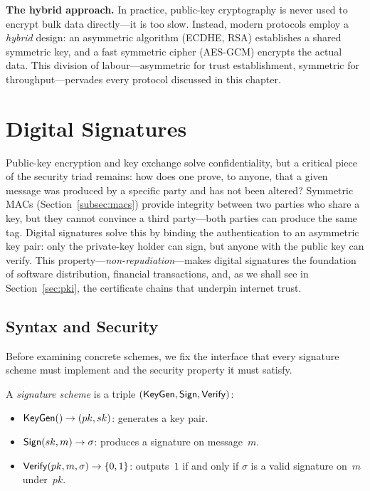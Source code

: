\begin{svgraybox}
\textbf{The hybrid approach.}  In practice, public-key cryptography is never used to encrypt bulk data directly---it is too slow.  Instead, modern protocols employ a \emph{hybrid} design: an asymmetric algorithm (ECDHE, RSA) establishes a shared symmetric key, and a fast symmetric cipher (AES-GCM) encrypts the actual data.  This division of labour---asymmetric for trust establishment, symmetric for throughput---pervades every protocol discussed in this chapter.
\end{svgraybox}


\section{Digital Signatures}
\label{sec:signatures}

Public-key encryption and key exchange solve confidentiality, but a critical piece of the security triad remains: how does one prove, to anyone, that a given message was produced by a specific party and has not been altered?  Symmetric MACs (Section~\ref{subsec:macs}) provide integrity between two parties who share a key, but they cannot convince a third party---both parties can produce the same tag.  Digital signatures solve this by binding the authentication to an asymmetric key pair: only the private-key holder can sign, but anyone with the public key can verify.  This property---\emph{non-repudiation}---makes digital signatures the foundation of software distribution, financial transactions, and, as we shall see in Section~\ref{sec:pki}, the certificate chains that underpin internet trust.

\subsection{Syntax and Security}
\label{subsec:sig-syntax}

Before examining concrete schemes, we fix the interface that every signature scheme must implement and the security property it must satisfy.

\begin{definition}
\label{def:signature}
A \emph{signature scheme} is a triple $(\mathsf{KeyGen}, \mathsf{Sign}, \mathsf{Verify})$:
\begin{itemize}
\item $\mathsf{KeyGen}() \to (pk, sk)$: generates a key pair.
\item $\mathsf{Sign}(sk, m) \to \sigma$: produces a signature on message~$m$.
\item $\mathsf{Verify}(pk, m, \sigma) \to \{0, 1\}$: outputs~$1$ if and only if $\sigma$ is a valid signature on~$m$ under~$pk$.
\end{itemize}
\end{definition}

